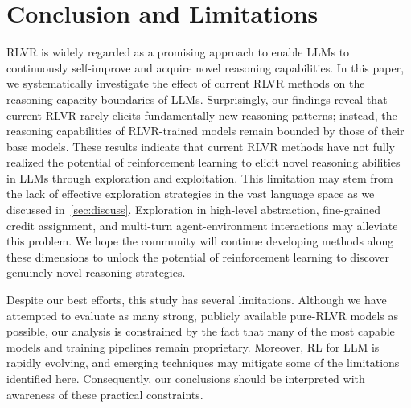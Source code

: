 \vspace{-0.5mm}
\section{Conclusion and Limitations}
\vspace{-0.5mm}

RLVR is widely regarded as a promising approach to enable LLMs to continuously self-improve and acquire novel reasoning capabilities. 
In this paper, we systematically investigate the effect of current RLVR methods on the reasoning capacity boundaries of LLMs.
Surprisingly, our findings reveal that current RLVR rarely elicits fundamentally new reasoning patterns; instead, the reasoning capabilities of RLVR-trained models remain bounded by those of their base models. 
These results indicate that current RLVR methods have not fully realized the potential of reinforcement learning to elicit novel reasoning abilities in LLMs through exploration and exploitation. 
This limitation may stem from the lack of effective exploration strategies in the vast language space as we discussed in~\cref{sec:discuss}. Exploration in high-level abstraction, fine-grained credit assignment, and multi-turn agent-environment interactions may alleviate this problem. 
We hope the community will continue developing methods along these dimensions to unlock the potential of reinforcement learning to discover genuinely novel reasoning strategies.

Despite our best efforts, this study has several limitations. Although we have attempted to evaluate as many strong, publicly available pure-RLVR models as possible, our analysis is constrained by the fact that many of the most capable models and training pipelines remain proprietary. Moreover, RL for LLM is rapidly evolving, and emerging techniques may mitigate some of the limitations identified here. Consequently, our conclusions should be interpreted with awareness of these practical constraints.

